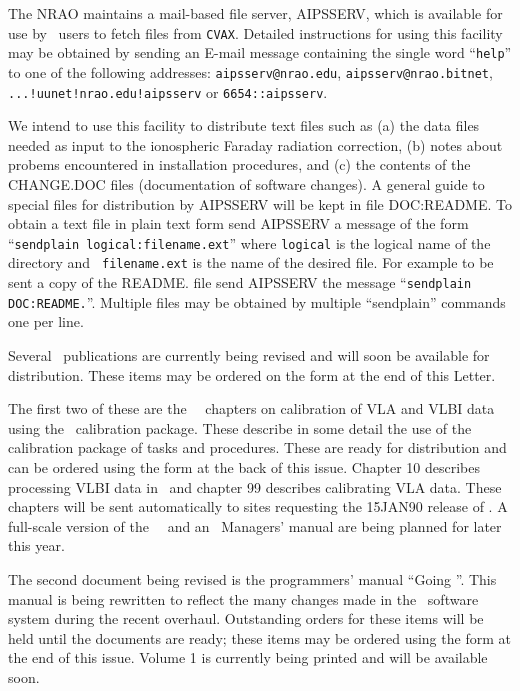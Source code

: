 
   The NRAO maintains a mail-based file server, AIPSSERV, which is
available for use by \AIPS\ users to fetch files from {\tt CVAX}.
Detailed instructions for using this facility may be obtained by
sending an E-mail message containing the single word ``{\tt help}'' to
one of the following addresses:\hfil\break
{\tt aipsserv@nrao.edu},
{\tt aipsserv@nrao.bitnet},
{\tt ...!uunet!nrao.edu!aipsserv}
or {\tt 6654::aipsserv}.

   We intend to use this facility to distribute text files such as (a)
the data files needed as input to the ionospheric Faraday radiation
correction, (b) notes about probems
encountered in installation procedures, and (c) the contents of the
CHANGE.DOC files (documentation of software changes).  A general guide
to special files for distribution by AIPSSERV will be kept in file
DOC:README.  To obtain a text file in plain text form send AIPSSERV a
message of the form ``{\tt sendplain logical:filename.ext}'' where
{\tt logical} is the logical name of the directory and {\tt
filename.ext} is the name of the desired file.
For example to be sent a copy of the README. file send AIPSSERV the
message ``{\tt sendplain DOC:README.}''.
Multiple files may be
obtained by multiple ``sendplain'' commands one per line.

\vfil\eject
{}

   Several \AIPS\ publications are currently being revised and
will soon be available for distribution.  These items may be ordered
on the form at the end of this \AIPS Letter.

   The first two of these are the \AIPS\  \Cookbook\ chapters on
calibration of VLA and VLBI data using the \AIPS\  calibration package.
These describe in some detail the use of the calibration package of
tasks and procedures.  These are ready for distribution and
can be ordered using the form at the back of this issue.  Chapter 10
describes processing VLBI data in \AIPS\ and chapter 99 describes
calibrating VLA data.  These chapters will be sent automatically to
sites requesting the 15JAN90 release of \AIPS.  A full-scale version
of the \AIPS\ \Cookbook\ and an \AIPS\ Managers' manual are being
planned for later this year.

   The second document being revised is the programmers' manual
``Going \AIPS''.  This manual is being rewritten to reflect the many
changes made in the \AIPS\ software system during the recent overhaul.
Outstanding orders for these items will be held until the documents
are ready; these items may be ordered using the form at the end of
this issue.  Volume 1 is currently being printed and will be available
soon.


